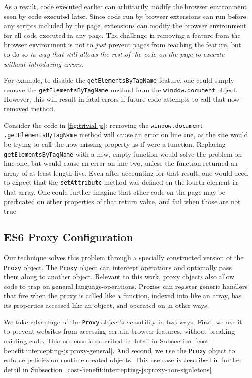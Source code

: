 As a result, code executed earlier can arbitrarily modify the browser environment
seen by code executed later.  Since code run by browser extensions can
run before any scripts included by the page, extensions can modify the
browser environment for all code executed in any page.
The challenge in removing a feature from the browser environment is not to
\textit{just} prevent pages from reaching the feature, but to do so \textit{in way that
still allows the rest of the code on the page to execute without introducing errors}.

For example, to disable the \texttt{getElementsByTagName} feature, one could
simply remove the \texttt{getElementsByTagName} method from the
\texttt{window.document} object. However, this will result in fatal errors
if future code attempts to call that now-removed method.

Consider the code in \ref{fig:trivial-js}:  removing the
\texttt{window.document} \texttt{.getElementsByTagName} method will cause an error
on line one, as the site would be trying to call the now-missing property as if
were a function.  Replacing \texttt{getElementsByTagName} with a new, empty
function would solve the problem on line one, but would cause an error on line
two, unless the function returned an array of at least length five. Even after
accounting for that result, one would need to expect that the
\texttt{setAttribute} method was defined on the fourth element in that array.
One could further imagine that other code on the page may be predicated on
other properties of that return value, and fail when those are not true.



\subsection{ES6 Proxy Configuration}

Our technique solves this problem through a specially constructed version of
the \texttt{Proxy} object.  The \texttt{Proxy} object can intercept operations
and optionally pass them along to another object.  Relevant to this work,
proxy objects also allow code to trap on general language-operations.  Proxies
can register generic handlers that fire when the proxy is called like a
function, indexed into like an array, has its properties accessed like an object,
and operated on in other ways.

We take advantage of the \texttt{Proxy} object's versatility in two ways.
First, we use it to prevent websites from accessing certain browser
features, without breaking existing code.  This use case is described in detail
in Subsection~\ref{cost-benefit:intercepting-js:proxy-general}.  And second, we use the \texttt{Proxy}
object to enforce policies on runtime created objects.  This use case is
described in further detail in Subsection~\ref{cost-benefit:intercepting-js:proxy-non-signletons}


